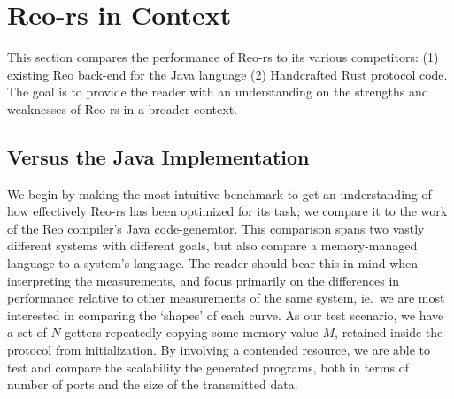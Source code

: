 \section{Reo-rs in Context}
\label{sec:in_context}
This section compares the performance of Reo-rs to its various competitors: (1) existing Reo back-end for the Java language (2) Handcrafted Rust protocol code. The goal is to provide the reader with an understanding on the strengths and weaknesses of Reo-rs in a broader context.

\subsection{Versus the Java Implementation}
We begin by making the most intuitive benchmark to get an understanding of how effectively Reo-rs has been optimized for its task; we compare it to the work of the Reo compiler's Java code-generator. This comparison spans two vastly different systems with different goals, but also compare a memory-managed language to a system's language. The reader should bear this in mind when interpreting the measurements, and focus primarily on the differences in performance relative to other measurements of the same system, ie.\ we are most interested in comparing the `shapes' of each curve. As our test scenario, we have a set of $N$ getters repeatedly copying some memory value $M$, retained inside the protocol from initialization. By involving a contended resource, we are able to test and compare the scalability the generated programs, both in terms of number of ports and the size of the transmitted data.

